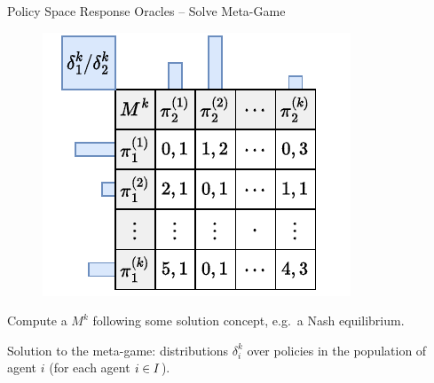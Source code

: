 \begin{frame}[t]{Policy Space Response Oracles -- Solve Meta-Game}
    \vspace{.5em}

    \begin{minipage}{0.39\textwidth}
        \begin{figure}
            \centering
            \includegraphics[width=\textwidth]{images/chapter_9/psro-solve}
        \end{figure}
    \end{minipage}
    \hfill
    \begin{minipage}{0.54\textwidth}
        Compute a  $M^k$ following some solution concept, e.g.\ a Nash equilibrium.\\

        \pause

        Solution to the meta-game: distributions $\delta_i^k$ over policies in the population of agent $i$ (for each agent $i\in I$).

    \end{minipage}
\end{frame}


